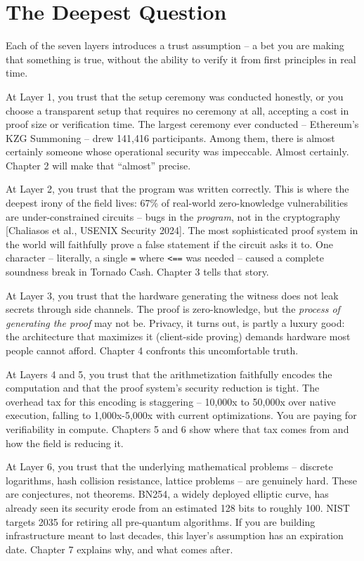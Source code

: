 \documentclass[
  11pt,
  openany]{report}
\begin{document}
\section{The Deepest Question}\label{the-deepest-question}

Each of the seven layers introduces a trust assumption -- a bet you are making
that something is true, without the ability to verify it from first principles
in real time.

At Layer 1, you trust that the setup ceremony was conducted honestly, or you
choose a transparent setup that requires no ceremony at all, accepting a cost in
proof size or verification time. The largest ceremony ever conducted --
Ethereum's KZG Summoning -- drew 141,416 participants. Among them, there is
almost certainly someone whose operational security was impeccable. Almost
certainly. Chapter 2 will make that ``almost'' precise.

At Layer 2, you trust that the program was written correctly. This is where the
deepest irony of the field lives: 67\% of real-world zero-knowledge
vulnerabilities are under-constrained circuits -- bugs in the \emph{program},
not in the cryptography {[}Chaliasos et al., USENIX Security 2024{]}. The most
sophisticated proof system in the world will faithfully prove a false statement
if the circuit asks it to. One character -- literally, a single \texttt{=} where
\texttt{\textless{}==} was needed -- caused a complete soundness break in
Tornado Cash. Chapter 3 tells that story.

At Layer 3, you trust that the hardware generating the witness does not leak
secrets through side channels. The proof is zero-knowledge, but the
\emph{process of generating the proof} may not be. Privacy, it turns out, is
partly a luxury good: the architecture that maximizes it (client-side proving)
demands hardware most people cannot afford. Chapter 4 confronts this
uncomfortable truth.

At Layers 4 and 5, you trust that the arithmetization faithfully encodes the
computation and that the proof system's security reduction is tight. The
overhead tax for this encoding is staggering -- 10,000x to 50,000x over native
execution, falling to 1,000x-5,000x with current optimizations. You are paying
for verifiability in compute. Chapters 5 and 6 show where that tax comes from
and how the field is reducing it.

At Layer 6, you trust that the underlying mathematical problems -- discrete
logarithms, hash collision resistance, lattice problems -- are genuinely hard.
These are conjectures, not theorems. BN254, a widely deployed elliptic curve,
has already seen its security erode from an estimated 128 bits to roughly 100.
NIST targets 2035 for retiring all pre-quantum algorithms. If you are building
infrastructure meant to last decades, this layer's assumption has an expiration
date. Chapter 7 explains why, and what comes after.
\end{document}
